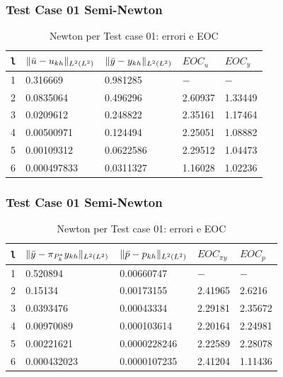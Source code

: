\documentclass{beamer}
\theoremstyle{definition}
\theoremstyle{remark}
\theoremstyle{plain}
\theoremstyle{definition}
\DeclarePairedDelimiter{\norma}{\lVert}{\rVert}
\begin{document}
\begin{frame}
\frametitle{Test Case 01 Semi-Newton}

\begin{table}
\caption{Newton per Test case 01: errori e EOC }
\label{newtonI}
\centering

\begin{tabular}{cllll}
\toprule
{\texttt{l}}           &  {$ \norma{\bar{u}-u_{kh}}_{L^2(L^2)} $} &  {$ \norma{\bar{y}-y_{kh}}_{L^2(L^2)} $} &  {$ EOC_u $} &  {$ EOC_y $} \\
\midrule
1            &  0.316669 &  0.981285 &  {$-$} &  {$-$} \\
2            &  0.0835064 &  0.496296 &  2.60937 &  1.33449 \\
3            &  0.0209612 &  0.248822 &  2.35161 &  1.17464 \\
4            &  0.00500971 &  0.124494  &  2.25051 &  1.08882 \\
5            &  0.00109312 &  0.0622586 &  2.29512 &  1.04473 \\
6            &  0.000497833 &  0.0311327 &  1.16028 &  1.02236 \\
\bottomrule
\end{tabular}              
\end{table}

\end{frame}

\begin{frame}
\frametitle{Test Case 01 Semi-Newton}
\begin{table}
\caption{Newton per Test case 01: errori e EOC }
\label{newtonIbis}
\centering

\begin{tabular}{cllll}
\toprule
{\texttt{l}}           &  {$ \norma{\bar{y}-\pi_{P^*_k}y_{kh}}_{L^2(L^2)} $} & {$ \norma{\bar{p}-p_{kh}}_{L^2(L^2)} $} &  {$ EOC_{\pi y} $}  &  {$ EOC_p $} \\
\midrule
1            &  0.520894 &  0.00660747 &  {$-$} &  {$-$} \\
2            &  0.15134 &  0.00173155 &  2.41965 &  2.6216 \\
3            &  0.0393476 &  0.00043334 &  2.29181 &  2.35672 \\
4            &  0.00970089 &  0.000103614 &  2.20164 &  2.24981 \\
5            &  0.00221621 &  0.0000228246 &  2.22589 &  2.28078 \\
6            &  0.000432023 &  0.0000107235 &  2.41204 &  1.11436 \\
\bottomrule
\end{tabular}              
\end{table}

\end{frame}
\end{document}
